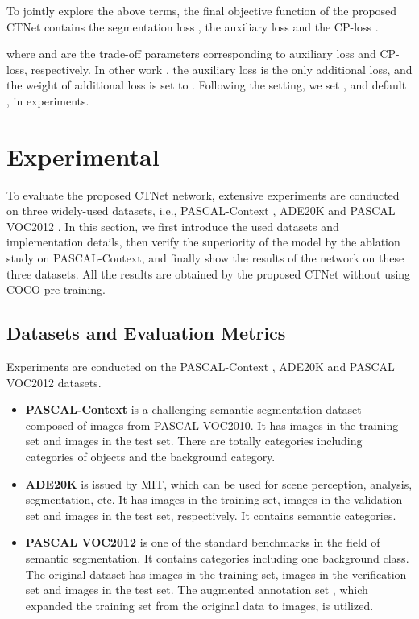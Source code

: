 \documentclass[10pt,journal,cspaper,compsoc]{IEEEtran}
\begin{document}
To jointly explore the above terms, the final objective function of the proposed CTNet contains the segmentation loss , the auxiliary loss  and the CP-loss .

where  and  are the trade-off parameters corresponding to auxiliary loss and CP-loss, respectively. In other work \cite{huang2019ccnet, li2019expectation, yuan2020object}, the auxiliary loss is the only additional loss, and the weight of additional loss is set to . Following the setting, we set , and default ,  in experiments.
	
\section{Experimental}
\label{exp}
To evaluate the proposed CTNet network, extensive experiments are conducted on three widely-used datasets, i.e., PASCAL-Context \cite{mottaghi2014role}, ADE20K \cite{zhou2017scene} and PASCAL VOC2012 \cite{everingham2010pascal}. In this section, we first introduce the used datasets and implementation details, then verify the superiority of the model by the ablation study on PASCAL-Context, and finally show the results of the network on these three datasets. All the results are obtained by the proposed CTNet without using COCO pre-training.
	
\subsection{Datasets and Evaluation Metrics}
Experiments are conducted on the PASCAL-Context \cite{mottaghi2014role}, ADE20K \cite{zhou2017scene} and PASCAL VOC2012 \cite{everingham2010pascal} datasets.
\begin{itemize}
\item \textbf{PASCAL-Context} \cite{mottaghi2014role} is a challenging semantic segmentation dataset composed of images from PASCAL VOC2010. It has  images in the training set and  images in the test set. There are totally  categories including  categories of objects and the background category.   
\item \textbf{ADE20K} \cite{zhou2017scene} is issued by MIT, which can be used for scene perception, analysis, segmentation, etc. It has  images in the training set,  images in the validation set and  images in the test set, respectively. It contains  semantic categories.
\item \textbf{PASCAL VOC2012} \cite{everingham2010pascal} is one of the standard benchmarks in the field of semantic segmentation. It contains  categories including one background class. The original dataset has  images in the training set,  images in the verification set and  images in the test set. The augmented annotation set \cite{hariharan2015hypercolumns}, which expanded the training set from the original data to  images, is utilized.
\end{itemize}
	
\end{document}

